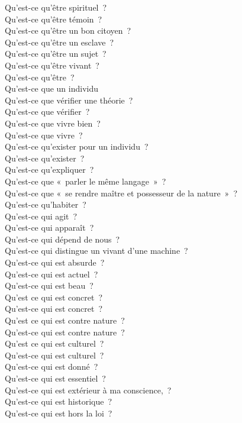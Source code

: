 \documentclass[a4paper,12pt]{article}
\begin{document}
Qu'est-ce qu'être spirituel ? \\
Qu'est-ce qu'être témoin ? \\
Qu'est-ce qu'être un bon citoyen ? \\
Qu'est-ce qu'être un esclave ? \\
Qu'est-ce qu'être un sujet ? \\
Qu'est-ce qu'être vivant ? \\
Qu'est-ce qu'être ? \\
Qu'est-ce que un individu \\
Qu'est-ce que vérifier une théorie ? \\
Qu'est-ce que vérifier ? \\
Qu'est-ce que vivre bien ? \\
Qu'est-ce que vivre ? \\
Qu'est-ce qu'exister pour un individu ? \\
Qu'est-ce qu'exister ? \\
Qu'est-ce qu'expliquer ? \\
Qu'est-ce que « parler le même langage » ? \\
Qu'est-ce que « se rendre maître et possesseur de la nature » ? \\
Qu'est-ce qu'habiter ? \\
Qu'est-ce qui agit ? \\
Qu'est-ce qui apparaît ? \\
Qu'est-ce qui dépend de nous ? \\
Qu'est-ce qui distingue un vivant d'une machine ? \\
Qu'est-ce qui est absurde ? \\
Qu'est-ce qui est actuel ? \\
Qu'est-ce qui est beau ? \\
Qu'est ce qui est concret ? \\
Qu'est-ce qui est concret ? \\
Qu'est ce qui est contre nature ? \\
Qu'est-ce qui est contre nature ? \\
Qu'est ce qui est culturel ? \\
Qu'est-ce qui est culturel ? \\
Qu'est-ce qui est donné ? \\
Qu'est-ce qui est essentiel ? \\
Qu'est-ce qui est extérieur à ma conscience, ? \\
Qu'est-ce qui est historique ? \\
Qu'est-ce qui est hors la loi ? \\
\end{document}
